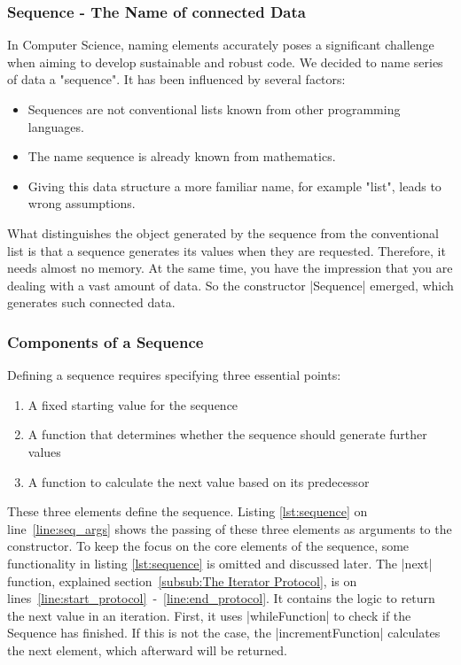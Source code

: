 \subsubsection{Sequence - The Name of connected Data}
\label{subsub:Sequence - The Name of connected Data}
In Computer Science, naming elements accurately poses a significant challenge 
when aiming to develop sustainable and robust code. We decided to name series
of data a "sequence". It has been influenced by several factors:

\begin{itemize}
  \item Sequences are not conventional lists known from other programming
    languages.
\item The name sequence is already known from mathematics.
\item Giving this data structure a more familiar name, for example "list",
  leads to wrong assumptions. 
\end{itemize}
What distinguishes the object generated by the sequence from the conventional
list is that a sequence generates its values when they are requested.
Therefore, it needs almost no memory. At the same time, you have the impression
that you are dealing with a vast amount of data. So the constructor |Sequence|
emerged, which generates such connected data.

\subsubsection{Components of a Sequence}
\label{subsub:Components of a Sequence}
Defining a sequence requires specifying three essential points:
\begin{enumerate}
  \item{A fixed starting value for the sequence} 
  \item{A function that determines whether the sequence should generate
    further values} 
  \item{A function to calculate the next value based on its predecessor} 
\end{enumerate}
These three elements define the sequence. Listing \ref{lst:sequence} on
line~\ref{line:seq_args} shows the passing of these three elements as arguments
to the constructor. To keep the focus on the core elements of the sequence,
some functionality in listing \ref{lst:sequence} is omitted and discussed later.
The |next| function, explained section~\ref{subsub:The Iterator Protocol}, is on
lines~\ref{line:start_protocol}~-~\ref{line:end_protocol}. It contains the
logic to return the next value in an iteration. First, it uses |whileFunction|
to check if the Sequence has finished. If this is not the case, the
|incrementFunction| calculates the next element, which afterward will be
returned.

